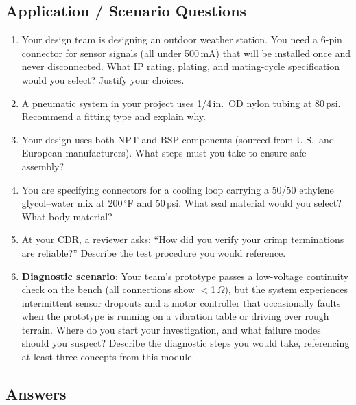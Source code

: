\subsection{Application / Scenario Questions}

\begin{enumerate}[resume,leftmargin=1.5em]
  \item Your design team is designing an outdoor weather station. You need a 6-pin connector for sensor signals (all under 500\,mA) that will be installed once and never disconnected. What IP rating, plating, and mating-cycle specification would you select? Justify your choices.

  \item A pneumatic system in your project uses 1/4\,in.\ OD nylon tubing at 80\,psi. Recommend a fitting type and explain why.

  \item Your design uses both NPT and BSP components (sourced from U.S.\ and European manufacturers). What steps must you take to ensure safe assembly?

  \item You are specifying connectors for a cooling loop carrying a 50/50 ethylene glycol--water mix at 200\,$^{\circ}$F and 50\,psi. What seal material would you select? What body material?

  \item At your CDR, a reviewer asks: ``How did you verify your crimp terminations are reliable?'' Describe the test procedure you would reference.

  \item \textbf{Diagnostic scenario}: Your team's prototype passes a low-voltage continuity check on the bench (all connections show $<$1\,$\Omega$), but the system experiences intermittent sensor dropouts and a motor controller that occasionally faults when the prototype is running on a vibration table or driving over rough terrain. Where do you start your investigation, and what failure modes should you suspect? Describe the diagnostic steps you would take, referencing at least three concepts from this module.
\end{enumerate}


\newpage
\subsection{Answers}

